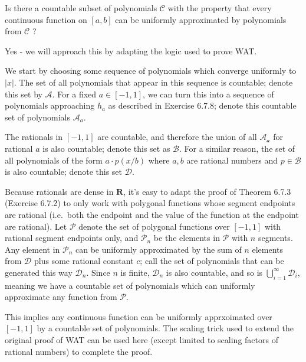 \begin{exercise}
    Is there a countable subset of polynomials $\mathcal{C}$ with the property that every continuous function on $[a, b]$ can be uniformly approximated by polynomials from $\mathcal{C}$ ?
\end{exercise}
\begin{solution}
Yes - we will approach this by adapting the logic used to prove WAT.

We start by choosing some sequence of polynomials which converge uniformly to \(|x|\). The set of all polynomials that appear in this sequence is countable; denote this set by \(\mathcal{A}\). For a fixed \(a \in [-1,1]\), we can turn this into a sequence of polynomials approaching \(h_a\) as described in Exercise 6.7.8; denote this countable set of polynomials \(\mathcal{A}_a\).

The rationals in \([-1,1]\) are countable, and therefore the union of all \(\mathcal{A_a}\) for rational \(a\) is also countable; denote this set as \(\mathcal{B}\). For a similar reason, the set of all polynomials of the form \(a \cdot p(x / b)\) where \(a,b\) are rational numbers and \(p \in \mathcal{B}\) is also countable; denote this set \(\mathcal{D}\).

Because rationals are dense in \(\mathbf{R}\), it's easy to adapt the proof of Theorem 6.7.3 (Exercise 6.7.2) to only work with polygonal functions whose segment endpoints are rational (i.e.\ both the endpoint and the value of the function at the endpoint are rational). Let \(\mathcal{P}\) denote the set of polygonal functions over \([-1,1]\) with rational segment endpoints only, and \(\mathcal{P}_n\) be the elements in \(\mathcal{P}\) with \(n\) segments. Any element in \(\mathcal{P}_n\) can be uniformly approximated by the sum of \(n\) elements from \(\mathcal{D}\) plus some rational constant \(c\); call the set of polynomials that can be generated this way \(\mathcal{D}_n\). Since \(n\) is finite, \(\mathcal{D}_n\) is also countable, and so is \(\bigcup^\infty_{i=1} \mathcal{D}_i\), meaning we have a countable set of polynomials which can uniformly approximate any function from \(\mathcal{P}\).

This implies any continuous function can be uniformly apprxoimated over \([-1,1]\) by a countable set of polynomials. The scaling trick used to extend the original proof of WAT can be used here (except limited to scaling factors of rational numbers) to complete the proof.
\end{solution}

